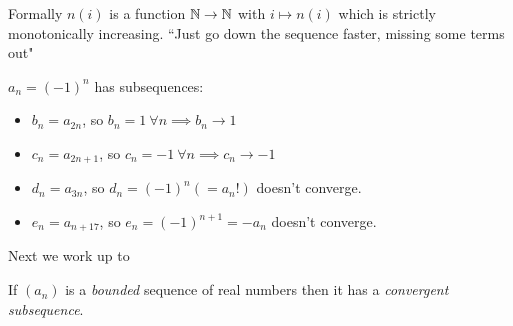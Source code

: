 \documentclass[10pt,twoside]{scrartcl}
\begin{document}
Formally $n(i)$ is a function $\mathbb{N} \to \mathbb{N}$ with $i \mapsto n(i)$ which is strictly monotonically increasing. ``Just go down the sequence faster, missing some terms out"\\

\begin{example}
$a_n = (-1)^n$ has subsequences:
\begin{itemize}
	\item $b_n = a_{2n}$, so $b_n = 1~\forall n \implies b_n \to 1$
	\item $c_n = a_{2n+1}$, so $c_n = -1~\forall n \implies c_n \to -1$
	\item $d_n = a_{3n}$, so $d_n = (-1)^n (=a_n!)$ doesn't converge. 
	\item $e_n = a_{n+17}$, so $e_n = (-1)^{n+1} = -a_n$ doesn't converge.
\end{itemize}

\end{example}


Next we work up to 


\begin{theorem}
If $(a_n)$ is a \emph{bounded} sequence of real numbers then it has a \emph{convergent subsequence}.
\end{theorem}
\end{document}
